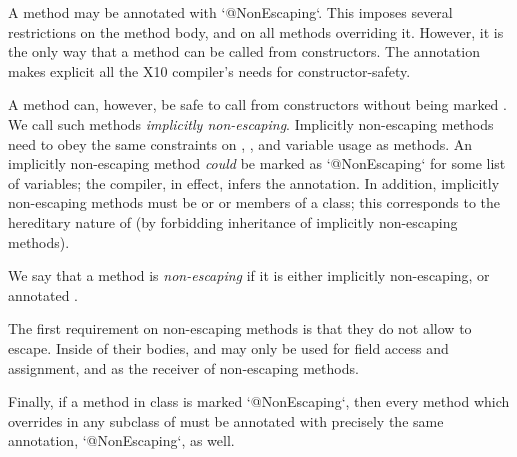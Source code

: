 A method may be annotated with \xcd`@NonEscaping`.  This
imposes several restrictions on the method body, and on all methods overriding
it.  However, it is the only way that a method can be called from
constructors.  The
 annotation makes explicit all the X10 compiler's needs for
constructor-safety.  

A method can, however, be safe to call from constructors without being marked
. We call such methods {\em implicitly non-escaping}.
Implicitly non-escaping methods need to obey the same constraints on
, , and variable usage as  methods. An
implicitly non-escaping method {\em could} be marked as
\xcd`@NonEscaping` for some list of variables; the compiler, in
effect, infers the annotation. In addition, implicitly non-escaping methods
must be  or  or members of a  class; this
corresponds to the hereditary nature of  (by forbidding
inheritance of implicitly non-escaping methods).

We say that a method is {\em non-escaping} if it is either implicitly
non-escaping, or annotated .

The first requirement on non-escaping methods is that they do not allow
 to escape. Inside of their bodies,  and  may
only be used for field access and assignment, and as the receiver of
non-escaping methods.

Finally, if a method  in class  is marked
\xcd`@NonEscaping`, then every method which overrides  in any
subclass of  must be annotated with precisely the same annotation,
\xcd`@NonEscaping`, as well.  

